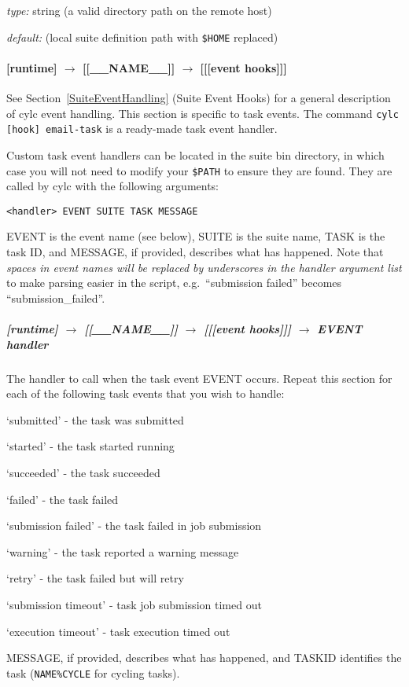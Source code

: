 \begin{myitemize}
\item {\em type:} string (a valid directory path on the remote host)
\item {\em default:} (local suite definition path with \lstinline=$HOME=
    replaced)
\end{myitemize}
 

\paragraph[{[[[}event hooks{]]]}]{[runtime] $\rightarrow$ [[\_\_NAME\_\_]] $\rightarrow$ [[[event hooks]]]}
\label{TaskEventHandling}

See Section~\ref{SuiteEventHandling} (Suite Event Hooks) for a general
description of cylc event handling. This section is specific to task events. 
The command \lstinline=cylc [hook] email-task= is a ready-made task event 
handler. 

Custom task event handlers can be located in the suite bin directory,  
in which case you will not need to modify your \lstinline=$PATH= to ensure
they are found.  They are called by cylc with the following arguments:
\begin{lstlisting}
<handler> EVENT SUITE TASK MESSAGE
\end{lstlisting}
EVENT is the event name (see below), SUITE is the suite name, TASK 
is the task ID, and MESSAGE, if provided, describes what has happened.
Note that {\em spaces in event names will be replaced by underscores 
in the handler argument list} to make parsing easier in the script,
e.g.\ ``submission failed'' becomes ``submission\_failed''.

\subparagraph[EVENT handler]{[runtime] $\rightarrow$ [[\_\_NAME\_\_]] $\rightarrow$ [[[event hooks]]] $\rightarrow$ EVENT handler}

The handler to call when the task event EVENT occurs. Repeat this
section for each of the following task events that you wish to handle:
\begin{myitemize}
    \item `submitted' - the task was submitted
    \item `started' - the task started running 
    \item `succeeded' - the task succeeded
    \item `failed' - the task failed
    \item `submission failed' - the task failed in job submission
    \item `warning' - the task reported a warning message
    \item `retry' - the task failed but will retry
    \item `submission timeout' - task job submission timed out
    \item `execution timeout' - task execution timed out
\end{myitemize}
MESSAGE, if provided, describes what has happened, and TASKID identifies
the task (\lstinline=NAME%CYCLE= for cycling tasks).


